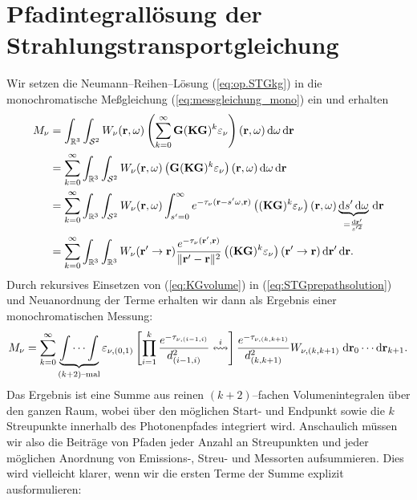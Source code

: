 	\section{Pfadintegrallösung der Strahlungstransportgleichung}
	Wir setzen die Neumann--Reihen--Lösung (\ref{eq:op.STGkg}) in die monochromatische Meßgleichung (\ref{eq:messgleichung_mono}) ein und erhalten
	\begin{align}
		M_\nu&=\int_{\mathbb{R}^3}\int_{\mathcal{S}^2}W_\nu(\mathbf{r},\omega) \left(\sum_{k=0}^\infty \mathbf{G} (\mathbf{KG})^k \varepsilon_\nu\right)(\mathbf{r},\omega) \,\text{d}\omega \,\text{d}\mathbf{r} \nonumber \\
		&=\sum_{k=0}^\infty \int_{\mathbb{R}^3}\int_{\mathcal{S}^2}W_\nu(\mathbf{r},\omega) \left(\mathbf{G} (\mathbf{KG})^k \varepsilon_\nu\right)(\mathbf{r},\omega) \,\text{d}\omega \,\text{d}\mathbf{r} \nonumber \\
		&=\sum_{k=0}^\infty \int_{\mathbb{R}^3}\int_{\mathcal{S}^2}W_\nu(\mathbf{r},\omega) \int_{s'=0}^\infty e^{-\tau_\nu(\mathbf{r}-s' \omega,\mathbf{r})} \left((\mathbf{KG})^k \varepsilon_\nu\right)(\mathbf{r},\omega) \underbrace{\text{d}s' \,\text{d}\omega}_{=\frac{\text{d}\mathbf{r}'}{s'^2}} \,\text{d}\mathbf{r} \nonumber \\
		&=\sum_{k=0}^\infty \int_{\mathbb{R}^3}\int_{\mathbb{R}^3}W_\nu(\mathbf{r}'\rightarrow\mathbf{r}) \frac{e^{-\tau_\nu(\mathbf{r}',\mathbf{r})}}{\|\mathbf{r}'-\mathbf{r}\|^2} \left((\mathbf{KG})^k \varepsilon_\nu\right)(\mathbf{r}'\rightarrow\mathbf{r}) \,\text{d}\mathbf{r}' \,\text{d}\mathbf{r}.
		\label{eq:STGprepathsolution}
	\end{align}
	Durch rekursives Einsetzen von (\ref{eq:KGvolume}) in (\ref{eq:STGprepathsolution}) und Neuanordnung der Terme erhalten wir dann als Ergebnis einer monochromatischen Messung:
	\begin{equation}
		M_\nu=\sum_{k=0}^\infty \underbrace{\idotsint}_{(k+2)\text{--mal}}\varepsilon_{\nu,(0,1)}\left[\prod_{i=1}^k\frac{e^{-\tau_{\nu,(i-1,i)}}}{d_{(i-1,i)}^2}\overset{i}{\leftrightsquigarrow}\right]\frac{e^{-\tau_{\nu,(k,k+1)}}}{d_{(k,k+1)}^2} W_{\nu,(k,k+1)} \;\text{d}\mathbf{r}_0 \dotsm \text{d}\mathbf{r}_{k+1} .
		\label{eq:STGpathsolution}
	\end{equation}
	Das Ergebnis ist eine Summe aus reinen $(k+2)$--fachen Volumenintegralen über den ganzen Raum, wobei über den möglichen Start- und Endpunkt sowie die $k$ Streupunkte innerhalb des Photonenpfades integriert wird.
	Anschaulich müssen wir also die Beiträge von Pfaden jeder Anzahl an Streupunkten und jeder möglichen Anordnung von Emissions-, Streu- und Mess\-orten aufsummieren. Dies wird vielleicht klarer, wenn wir die ersten Terme der Summe explizit ausformulieren:
